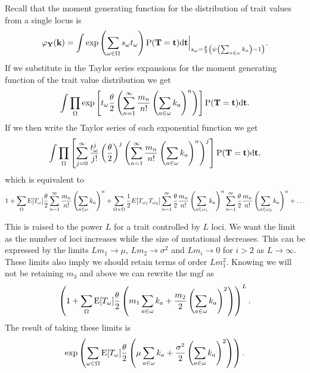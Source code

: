 Recall that the moment generating function for the distribution of trait values
from a single locus is
\begin{equation*}
  \varphi_{\mathbf{Y}}(\mathbf{k}) = \int \exp \left( \sum_{\omega \in \Omega} s_{\omega}t_{\omega} \right)
  \mathrm{P}(\mathbf{T}=\mathbf{t})\mathrm{d}\mathbf{t}
  \Bigr|_{s_{\omega}=\frac{\theta}{2} \left( \psi\left(\sum_{a \in \omega}k_{a}\right) -1 \right)}.
\end{equation*}
If we substitute in the Taylor series expansions for the moment generating
function of the trait value distribution we get
\begin{equation*}
  \int \prod_{\Omega} \exp\left[ t_{\omega} \frac{\theta}{2} \left( \sum_{n=1}^{\infty} \frac{m_n}{n!}
    \left( \sum_{a \in \omega} k_a \right)^n \right) \right]
  \mathrm{P}(\mathbf{T} = \mathbf{t}) \mathrm{d}\mathbf{t}.
\end{equation*}
If we then write the Taylor series of each exponential function we get
\begin{equation*}
  \int \prod_{\Omega} \left[ \sum_{j=0}^\infty \frac{t_{\omega}^j}{j!}
  \left( \frac{\theta}{2} \right)^j \left( \sum_{n=1}^{\infty} \frac{m_n}{n!}
  \left( \sum_{a \in \omega} k_a \right)^n \right)^j \right]
  \mathrm{P}(\mathbf{T} = \mathbf{t}) \mathrm{d}\mathbf{t},
\end{equation*}
which is equivalent to
\begin{equation*}
  1 + \sum_{\Omega} \mathrm{E}[T_\omega] \frac{\theta}{2} \sum_{n=1}^{\infty} \frac{m_n}{n!} \left(
  \sum_{a \in \omega} k_a \right)^n +
  \sum_{\Omega \times \Omega} \frac{1}{2} E[T_{\omega_1}T_{\omega_2}]
  \sum_{n=1}^{\infty} \frac{\theta}{2} \frac{m_n}{n!} \left(\sum_{a \in \omega_1} k_a \right)^n
  \sum_{n=1}^{\infty} \frac{\theta}{2} \frac{m_n}{n!} \left(\sum_{a \in \omega_2} k_a \right)^n + \ldots
\end{equation*}

This is raised to the power $L$ for a trait controlled by $L$ loci. We want the
limit as the number of loci increases while the size of mutational decreases.
This can be expressed by the limits $L m_1 \to \mu$, $L m_2\to \sigma^2$
and $L m_i\to 0$ for $i>2$ as $L \to \infty$. These limits also imply we
should retain terms of order $L m_1^2$. Knowing we will not be retaining $m_3$ and
above we can rewrite the mgf as
\begin{equation*}
  \left(1 + \sum_{\Omega} \mathrm{E}[T_\omega] \frac{\theta}{2} \left(m_1 \sum_{a \in \omega} k_a +
  \frac{m_2}{2} \left(\sum_{a \in \omega} k_a \right)^2\right)\right)^L.
\end{equation*}
The result of taking these limits is
\begin{equation}
  \label{eq:norm_mgf}
  \exp \left( \sum_{\omega \in \Omega}\mathrm{E}[T_{\omega}] \frac{\theta}{2} \left( \mu 
  \sum_{a \in \omega} k_a + \frac{\sigma^2}{2}\left( \sum_{a \in \omega}
  k_a\right)^2\right)\right).
\end{equation}

